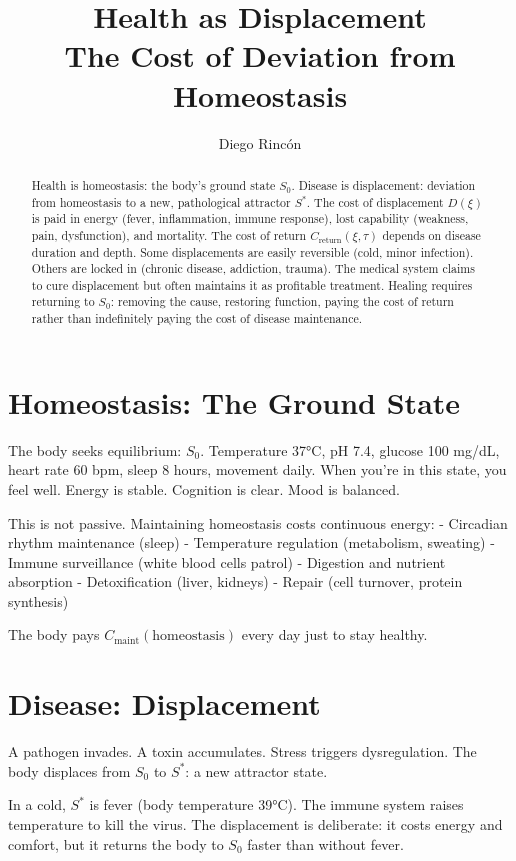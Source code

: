 \documentclass[12pt]{article}
\title{Health as Displacement\\
The Cost of Deviation from Homeostasis}
\author{Diego Rincón}
\date{}
\begin{document}
\maketitle

\begin{abstract}
Health is homeostasis: the body's ground state $S_0$. Disease is displacement: deviation from homeostasis to a new, pathological attractor $S^*$. The cost of displacement $D(\xi)$ is paid in energy (fever, inflammation, immune response), lost capability (weakness, pain, dysfunction), and mortality. The cost of return $C_{\text{return}}(\xi, \tau)$ depends on disease duration and depth. Some displacements are easily reversible (cold, minor infection). Others are locked in (chronic disease, addiction, trauma). The medical system claims to cure displacement but often maintains it as profitable treatment. Healing requires returning to $S_0$: removing the cause, restoring function, paying the cost of return rather than indefinitely paying the cost of disease maintenance.
\end{abstract}

\section{Homeostasis: The Ground State}

The body seeks equilibrium: $S_0$. Temperature 37°C, pH 7.4, glucose 100 mg/dL, heart rate 60 bpm, sleep 8 hours, movement daily. When you're in this state, you feel well. Energy is stable. Cognition is clear. Mood is balanced.

This is not passive. Maintaining homeostasis costs continuous energy:
- Circadian rhythm maintenance (sleep)
- Temperature regulation (metabolism, sweating)
- Immune surveillance (white blood cells patrol)
- Digestion and nutrient absorption
- Detoxification (liver, kidneys)
- Repair (cell turnover, protein synthesis)

The body pays $C_{\text{maint}}(\text{homeostasis})$ every day just to stay healthy.

\section{Disease: Displacement}

A pathogen invades. A toxin accumulates. Stress triggers dysregulation. The body displaces from $S_0$ to $S^*$: a new attractor state.

In a cold, $S^*$ is fever (body temperature 39°C). The immune system raises temperature to kill the virus. The displacement is deliberate: it costs energy and comfort, but it returns the body to $S_0$ faster than without fever.
\end{document}
